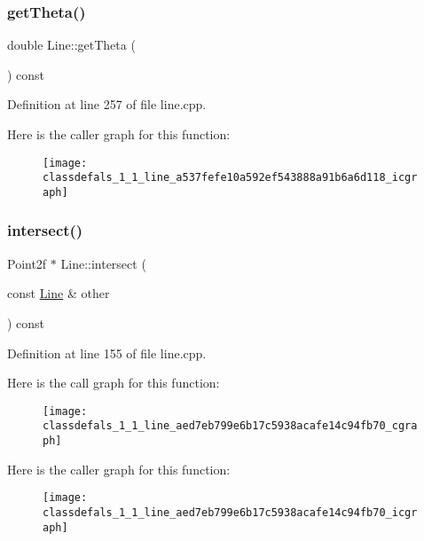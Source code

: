 \mbox{\label{classdefals_1_1_line_a537fefe10a592ef543888a91b6a6d118}} 
\subsubsection{\texorpdfstring{get\+Theta()}{getTheta()}}
{\footnotesize\ttfamily double Line\+::get\+Theta (\begin{DoxyParamCaption}{ }\end{DoxyParamCaption}) const}



Definition at line 257 of file line.\+cpp.

Here is the caller graph for this function\+:\nopagebreak
\begin{figure}[H]
\begin{center}
\leavevmode
\texttt{[image: classdefals\_1\_1\_line\_a537fefe10a592ef543888a91b6a6d118\_icgraph]}
\end{center}
\end{figure}
\mbox{\label{classdefals_1_1_line_aed7eb799e6b17c5938acafe14c94fb70}} 
\subsubsection{\texorpdfstring{intersect()}{intersect()}}
{\footnotesize\ttfamily Point2f $\ast$ Line\+::intersect (\begin{DoxyParamCaption}\item[{const \hyperlink{classdefals_1_1_line}{Line} \&}]{other }\end{DoxyParamCaption}) const}



Definition at line 155 of file line.\+cpp.

Here is the call graph for this function\+:\nopagebreak
\begin{figure}[H]
\begin{center}
\leavevmode
\texttt{[image: classdefals\_1\_1\_line\_aed7eb799e6b17c5938acafe14c94fb70\_cgraph]}
\end{center}
\end{figure}
Here is the caller graph for this function\+:\nopagebreak
\begin{figure}[H]
\begin{center}
\leavevmode
\texttt{[image: classdefals\_1\_1\_line\_aed7eb799e6b17c5938acafe14c94fb70\_icgraph]}
\end{center}
\end{figure}
\mbox{\label{classdefals_1_1_line_ae479c8d219ad3eb6088f17fb1b7178ef}} 
